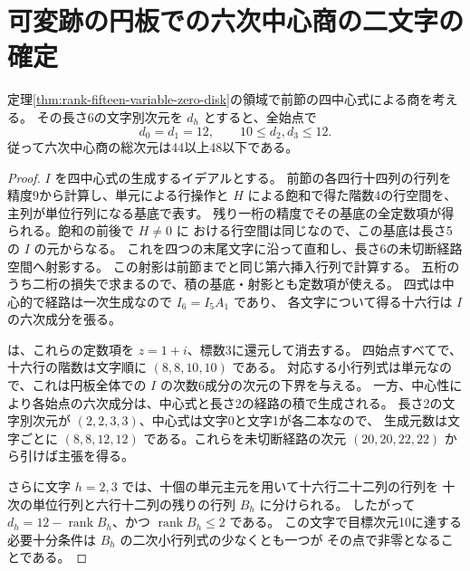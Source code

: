 \section{可変跡の円板での六次中心商の二文字の確定}
\label{sec:rank-fifteen-saturated-center-products}
\begin{proposition}
定理\ref{thm:rank-fifteen-variable-zero-disk}の領域で前節の四中心式による商を考える。
その長さ6の文字別次元を $d_h$ とすると、全始点で
\[
            d_0=d_1=12,\qquad 10\le d_2,d_3\le12 .
\]
従って六次中心商の総次元は44以上48以下である。
\end{proposition}
\begin{proof}
$I$ を四中心式の生成するイデアルとする。
前節の各四行十四列の行列を精度9から計算し、単元による行操作と
$H$ による飽和で得た階数4の行空間を、主列が単位行列になる基底で表す。
残り一桁の精度でその基底の全定数項が得られる。飽和の前後で $H\ne0$ に
おける行空間は同じなので、この基底は長さ5の $I$ の元からなる。
これを四つの末尾文字に沿って直和し、長さ6の未切断経路空間へ射影する。
この射影は前節までと同じ第六挿入行列で計算する。
五桁のうち二桁の損失で求まるので、積の基底・射影とも定数項が使える。
四式は中心的で経路は一次生成なので $I_6=I_5 A_1$ であり、
各文字について得る十六行は $I$ の六次成分を張る。

は、これらの定数項を $z=1+i$、標数3に還元して消去する。
四始点すべてで、十六行の階数は文字順に $(8,8,10,10)$ である。
対応する小行列式は単元なので、これは円板全体での $I$ の次数6成分の次元の下界を与える。
一方、中心性により各始点の六次成分は、中心式と長さ2の経路の積で生成される。
長さ2の文字別次元が $(2,2,3,3)$、中心式は文字0と文字1が各二本なので、
生成元数は文字ごとに $(8,8,12,12)$ である。これらを未切断経路の次元
$(20,20,22,22)$ から引けば主張を得る。

さらに文字 $h=2,3$ では、十個の単元主元を用いて十六行二十二列の行列を
十次の単位行列と六行十二列の残りの行列 $B_h$ に分けられる。
したがって $d_h=12-\operatorname{rank} B_h$、かつ $\operatorname{rank} B_h\le2$ である。
この文字で目標次元10に達する必要十分条件は $B_h$ の二次小行列式の少なくとも一つが
その点で非零となることである。
\end{proof}
